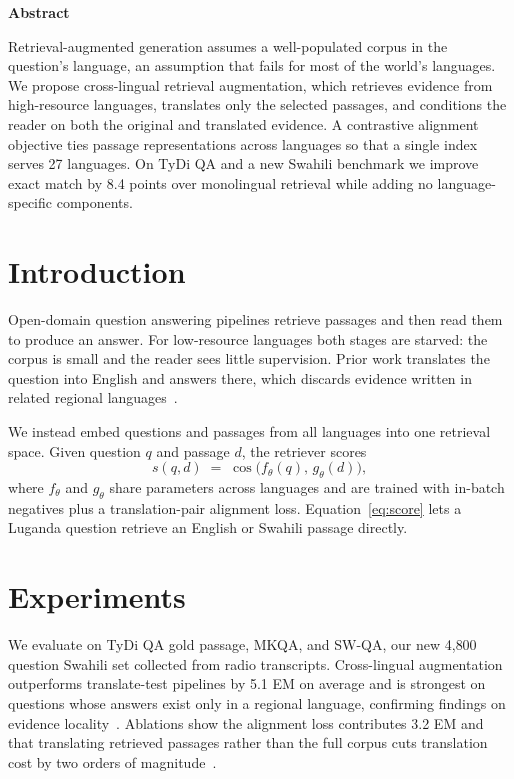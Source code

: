 \documentclass[10pt,twocolumn]{article}
\begin{document}
\thispagestyle{empty}

\begin{center}{\bfseries Abstract}\end{center}
\noindent Retrieval-augmented generation assumes a well-populated corpus in
the question's language, an assumption that fails for most of the world's
languages. We propose cross-lingual retrieval augmentation, which retrieves
evidence from high-resource languages, translates only the selected passages,
and conditions the reader on both the original and translated evidence. A
contrastive alignment objective ties passage representations across languages
so that a single index serves 27 languages. On TyDi QA and a new Swahili
benchmark we improve exact match by 8.4 points over monolingual retrieval
while adding no language-specific components.

\section{Introduction}
Open-domain question answering pipelines retrieve passages and then read them
to produce an answer. For low-resource languages both stages are starved: the
corpus is small and the reader sees little supervision. Prior work translates
the question into English and answers there, which discards evidence written
in related regional languages~\cite{nabirye2023translate}.

We instead embed questions and passages from all languages into one retrieval
space. Given question $q$ and passage $d$, the retriever scores
\begin{equation}
  s(q, d) \;=\; \cos\bigl(f_{\theta}(q),\, g_{\theta}(d)\bigr),
  \label{eq:score}
\end{equation}
where $f_{\theta}$ and $g_{\theta}$ share parameters across languages and are
trained with in-batch negatives plus a translation-pair alignment loss.
Equation~\eqref{eq:score} lets a Luganda question retrieve an English or
Swahili passage directly.

\section{Experiments}
We evaluate on TyDi QA gold passage, MKQA, and SW-QA, our new 4{,}800
question Swahili set collected from radio transcripts. Cross-lingual
augmentation outperforms translate-test pipelines by 5.1 EM on average and is
strongest on questions whose answers exist only in a regional language,
confirming findings on evidence locality~\cite{osei2024locality}. Ablations
show the alignment loss contributes 3.2 EM and that translating retrieved
passages rather than the full corpus cuts translation cost by two orders of
magnitude~\cite{ferreira2022mrag}.
\end{document}
